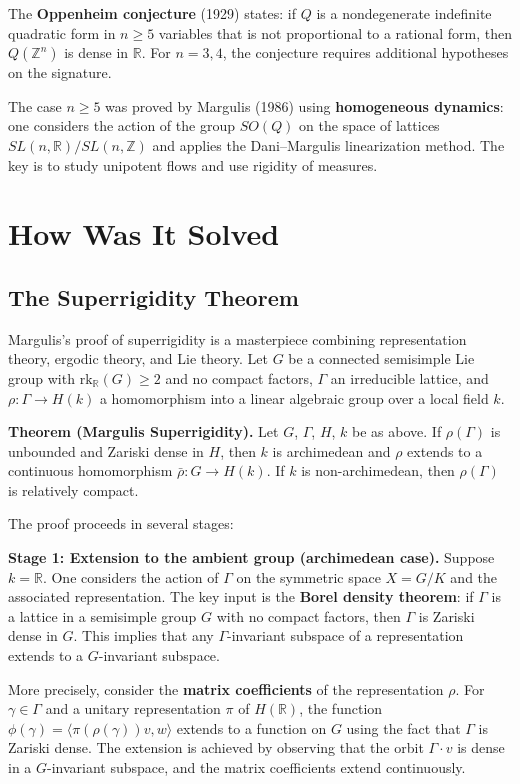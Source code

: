 The \textbf{Oppenheim conjecture} (1929) states: if $Q$ is a
nondegenerate indefinite quadratic form in $n \geq 5$ variables that is
not proportional to a rational form, then $Q(\mathbb{Z}^n)$ is dense
in $\mathbb{R}$. For $n = 3, 4$, the conjecture requires additional
hypotheses on the signature.

The case $n \geq 5$ was proved by Margulis (1986) using
\textbf{homogeneous dynamics}: one considers the action of the group
$SO(Q)$ on the space of lattices $SL(n,\mathbb{R})/SL(n,\mathbb{Z})$
and applies the Dani--Margulis linearization method. The key is to
study unipotent flows and use rigidity of measures.

\section{How Was It Solved}

\subsection{The Superrigidity Theorem}

Margulis's proof of superrigidity is a masterpiece combining
representation theory, ergodic theory, and Lie theory. Let $G$ be a
connected semisimple Lie group with $\mathrm{rk}_{\mathbb{R}}(G) \geq
2$ and no compact factors, $\Gamma$ an irreducible lattice, and
$\rho: \Gamma \to H(k)$ a homomorphism into a linear algebraic group
over a local field $k$.

\textbf{Theorem (Margulis Superrigidity).} Let $G$, $\Gamma$, $H$, $k$
be as above. If $\rho(\Gamma)$ is unbounded and Zariski dense in $H$,
then $k$ is archimedean and $\rho$ extends to a continuous homomorphism
$\bar{\rho}: G \to H(k)$. If $k$ is non-archimedean, then
$\rho(\Gamma)$ is relatively compact.

The proof proceeds in several stages:

\textbf{Stage 1: Extension to the ambient group (archimedean case).}
Suppose $k = \mathbb{R}$. One considers the action of $\Gamma$ on the
symmetric space $X = G/K$ and the associated representation. The key
input is the \textbf{Borel density theorem}: if $\Gamma$ is a lattice
in a semisimple group $G$ with no compact factors, then $\Gamma$ is
Zariski dense in $G$. This implies that any $\Gamma$-invariant
subspace of a representation extends to a $G$-invariant subspace.

More precisely, consider the \textbf{matrix coefficients} of the
representation $\rho$. For $\gamma \in \Gamma$ and a unitary
representation $\pi$ of $H(\mathbb{R})$, the function
$\phi(\gamma) = \langle \pi(\rho(\gamma))v, w \rangle$ extends to a
function on $G$ using the fact that $\Gamma$ is Zariski dense. The
extension is achieved by observing that the orbit $\Gamma \cdot v$ is
dense in a $G$-invariant subspace, and the matrix coefficients extend
continuously.


